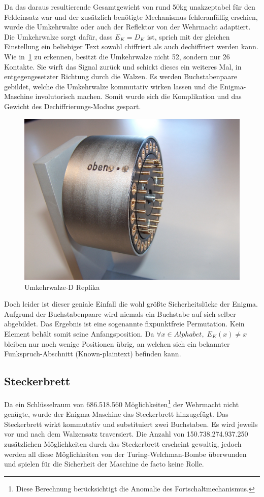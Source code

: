 Da das daraus resultierende Gesamtgewicht von rund 50\si{\kg} unakzeptabel für den Feldeinsatz war und der zusätzlich benötigte Mechanismus fehleranfällig erschien, wurde die Umkehrwalze oder auch der Reflektor von der Wehrmacht adaptiert.
Die Umkehrwalze sorgt dafür, dass $E_K = D_K$ ist, sprich mit der gleichen Einstellung ein beliebiger Text sowohl chiffriert als auch dechiffriert werden kann.
Wie in~\cref{fig:enigma_reflector} zu erkennen, besitzt die Umkehrwalze nicht 52, sondern nur 26 Kontakte.
Sie \glqq wirft\grqq{} das Signal zurück und schickt dieses ein weiteres Mal, in entgegengesetzter Richtung durch die Walzen.
Es werden Buchstabenpaare gebildet, welche die Umkehrwalze kommutativ wirken lassen und die Enigma-Maschine involutorisch machen.
Somit wurde sich die Komplikation und das Gewicht des Dechiffrierungs-Modus gespart.

\begin{figure}[htbp]
	\centering
	\includegraphics[width=.5\linewidth]{Enigma/UKW-D}
	\caption{Umkehrwalze-D Replika\autocite{enigmareflektor}}
	\label{fig:enigma_reflector}
\end{figure}

Doch leider ist dieser geniale Einfall die wohl größte Sicherheitslücke der Enigma.
Aufgrund der Buchstabenpaare wird niemals ein Buchstabe auf sich selber abgebildet.
Das Ergebnis ist eine sogenannte fixpunktfreie Permutation.
Kein Element behält somit seine Anfangsposition.
Da $\forall x \in Alphabet,\; E_K(x) \ne x$ bleiben nur noch wenige Positionen übrig, an welchen sich ein bekannter Funkspruch-Abschnitt (Known-plaintext) befinden kann.


\subsection{Steckerbrett}\label{subsec:steckerbrett}

Da ein Schlüsselraum von 686.518.560 Möglichkeiten\footnote{Diese Berechnung berücksichtigt die Anomalie des Fortschaltmechanismus.\autocite{wiki:enigma}} der Wehrmacht nicht genügte, wurde der Enigma-Maschine das Steckerbrett hinzugefügt.
Das Steckerbrett wirkt kommutativ und substituiert zwei Buchstaben. 
Es wird jeweils vor und nach dem Walzensatz traversiert. 
Die Anzahl von 150.738.274.937.250\autocite{wiki:enigma} zusätzlichen Möglichkeiten durch das Steckerbrett erscheint gewaltig, jedoch werden all diese Möglichkeiten von der Turing-Welchman-Bombe überwunden und spielen für die Sicherheit der Maschine de facto keine Rolle.

